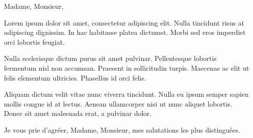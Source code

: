 \documentclass[a4paper,12pt]{letter}
\begin{document}
 




\subject{une demande un peu particulière}

Madame, Monsieur,

Lorem ipsum dolor sit amet, consectetur adipiscing elit. Nulla tincidunt risus
at adipiscing dignissim. In hac habitasse platea dictumst. Morbi sed eros
imperdiet orci lobortis feugiat.

Nulla scelerisque dictum purus sit amet pulvinar. Pellentesque lobortis
fermentum nisl non accumsan. Praesent in sollicitudin turpis. Maecenas ac elit
ut felis elementum ultricies. Phasellus id orci felis.

Aliquam dictum velit vitae nunc viverra tincidunt. Nulla eu ipsum
semper sapien mollis congue id at lectus. Aenean ullamcorper nisi ut nunc
aliquet lobortis. Donec sit amet malesuada erat, a pulvinar dolor.

Je vous prie d'agréer, Madame, Monsieur, mes salutations les plus distinguées.

\signature{John Doe}
\end{document}

